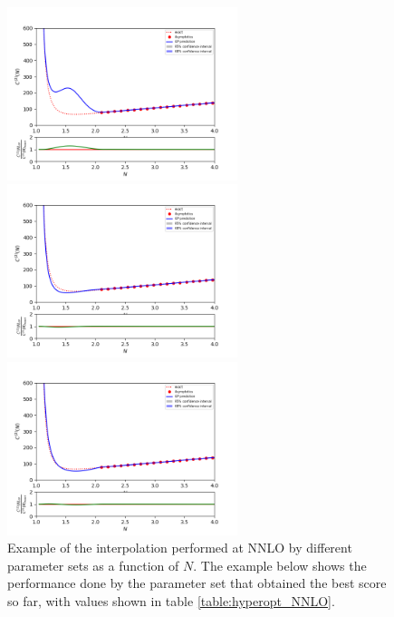 \documentclass[12pt]{article}
\begin{document}
\begin{figure}
	\centering
	
	\includegraphics[width=0.6\textwidth]{plots/nnlo_prod2.png}
	
	\includegraphics[width=0.6\textwidth]{plots/nnlo_sum2.png}
	
	\includegraphics[width=0.6\textwidth]{plots/nnlo_matern.png}
	
	\caption{Example of the interpolation performed at NNLO by different parameter sets as a function of $N$. The example below shows the performance done by the parameter set that obtained the best score so far, with values shown in table \ref{table:hyperopt_NNLO}.}
	\label{nnlo_examples}
	
\end{figure}
\end{document}
